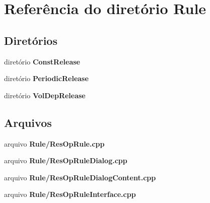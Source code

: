 \section{Referência do diretório Rule}
\label{dir_1911b62fd751f9a3eabdbf4bd9d3891e}
\subsection*{Diretórios}
\begin{DoxyCompactItemize}
\item 
diretório {\bf Const\+Release}
\item 
diretório {\bf Periodic\+Release}
\item 
diretório {\bf Vol\+Dep\+Release}
\end{DoxyCompactItemize}
\subsection*{Arquivos}
\begin{DoxyCompactItemize}
\item 
arquivo {\bf Rule/\+Res\+Op\+Rule.\+cpp}
\item 
arquivo {\bf Rule/\+Res\+Op\+Rule\+Dialog.\+cpp}
\item 
arquivo {\bf Rule/\+Res\+Op\+Rule\+Dialog\+Content.\+cpp}
\item 
arquivo {\bf Rule/\+Res\+Op\+Rule\+Interface.\+cpp}
\end{DoxyCompactItemize}

